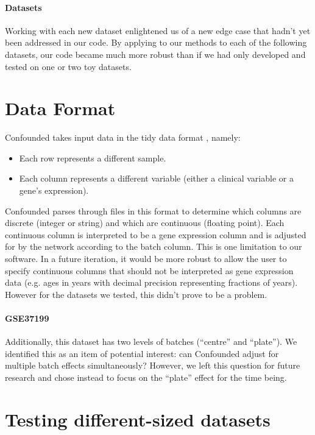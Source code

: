 \documentclass{article}
\begin{document}
\paragraph{Datasets}

Working with each new dataset enlightened us of a new edge case that hadn't yet been addressed in our code.
By applying to our methods to each of the following datasets, our code became much more robust than if we had only developed and tested on one or two toy datasets.


\section{Data Format}

Confounded takes input data in the tidy data format \cite{wickham_tidy_2014-1}, namely:

\begin{itemize}
	\item Each row represents a different sample.
	\item Each column represents a different variable (either a clinical variable or a gene's expression).
\end{itemize}

Confounded parses through files in this format to determine which columns are discrete (integer or string) and which are continuous (floating point).
Each continuous column is interpreted to be a gene expression column and is adjusted for by the network according to the batch column.
This is one limitation to our software.
In a future iteration, it would be more robust to allow the user to specify continuous columns that should not be interpreted as gene expression data (e.g. ages in years with decimal precision representing fractions of years).
However for the datasets we tested, this didn't prove to be a problem.

\paragraph{GSE37199}

Additionally, this dataset has two levels of batches (``centre'' and ``plate'').
We identified this as an item of potential interest: can Confounded adjust for multiple batch effects simultaneously?
However, we left this question for future research and chose instead to focus on the ``plate'' effect for the time being.

\section{Testing different-sized datasets}
\end{document}
